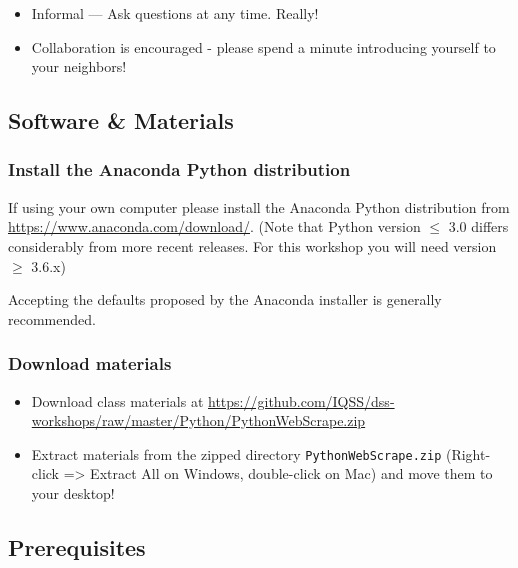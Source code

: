 \documentclass[]{book}
\providecommand{\tightlist}{%
  \setlength{\itemsep}{0pt}\setlength{\parskip}{0pt}}
\begin{document}
\begin{itemize}
\tightlist
\item
  Informal --- Ask questions at any time. Really!
\item
  Collaboration is encouraged - please spend a minute introducing yourself to your neighbors!
\end{itemize}

\hypertarget{software-materials-5}{%
\subsection{Software \& Materials}\label{software-materials-5}}

\hypertarget{install-the-anaconda-python-distribution-1}{%
\subsubsection{Install the Anaconda Python distribution}\label{install-the-anaconda-python-distribution-1}}

If using your own computer please install the Anaconda Python
distribution from
\url{https://www.anaconda.com/download/}.
(Note that Python version \(\leq\) 3.0 differs considerably from more
recent releases. For this workshop you will need version \(\geq\) 3.6.x)

Accepting the defaults proposed by the Anaconda installer is generally recommended.

\hypertarget{download-materials-1}{%
\subsubsection{Download materials}\label{download-materials-1}}

\begin{itemize}
\tightlist
\item
  Download class materials at \url{https://github.com/IQSS/dss-workshops/raw/master/Python/PythonWebScrape.zip}
\item
  Extract materials from the zipped directory \texttt{PythonWebScrape.zip} (Right-click =\textgreater{} Extract All on Windows, double-click on Mac) and move them to your desktop!
\end{itemize}

\hypertarget{prerequisites-5}{%
\subsection{Prerequisites}\label{prerequisites-5}}
\end{document}
